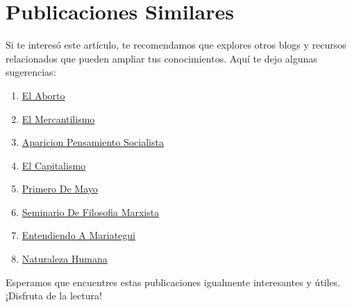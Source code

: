 \documentclass[
  jou,
  floatsintext,
  longtable,
  a4paper,
  nolmodern,
  notxfonts,
  notimes,
  12pt,
  colorlinks=true,linkcolor=blue,citecolor=blue,urlcolor=blue]{apa7}
\providecommand{\tightlist}{%
  \setlength{\itemsep}{0pt}\setlength{\parskip}{0pt}}
\begin{document}
\section{Publicaciones Similares}\label{publicaciones-similares}

Si te interesó este artículo, te recomendamos que explores otros blogs y
recursos relacionados que pueden ampliar tus conocimientos. Aquí te dejo
algunas sugerencias:

\begin{enumerate}
\def\labelenumi{\arabic{enumi}.}
\tightlist
\item
  \href{https://dialectica-y-mercado.netlify.app/posts/2015-05-14-el-aborto/index.pdf}{}
  \href{https://dialectica-y-mercado.netlify.app/posts/2015-05-14-el-aborto}{El
  Aborto}
\item
  \href{https://dialectica-y-mercado.netlify.app/posts/2017-05-23-el-mercantilismo/index.pdf}{}
  \href{https://dialectica-y-mercado.netlify.app/posts/2017-05-23-el-mercantilismo}{El
  Mercantilismo}
\item
  \href{https://dialectica-y-mercado.netlify.app/posts/2018-04-23-aparicion-pensamiento-socialista/index.pdf}{}
  \href{https://dialectica-y-mercado.netlify.app/posts/2018-04-23-aparicion-pensamiento-socialista}{Aparicion
  Pensamiento Socialista}
\item
  \href{https://dialectica-y-mercado.netlify.app/posts/2023-03-03-el-capitalismo/index.pdf}{}
  \href{https://dialectica-y-mercado.netlify.app/posts/2023-03-03-el-capitalismo}{El
  Capitalismo}
\item
  \href{https://dialectica-y-mercado.netlify.app/posts/2023-04-29-primero-de-mayo/index.pdf}{}
  \href{https://dialectica-y-mercado.netlify.app/posts/2023-04-29-primero-de-mayo}{Primero
  De Mayo}
\item
  \href{https://dialectica-y-mercado.netlify.app/posts/2023-05-19-seminario-de-filosofia-marxista/index.pdf}{}
  \href{https://dialectica-y-mercado.netlify.app/posts/2023-05-19-seminario-de-filosofia-marxista}{Seminario
  De Filosofia Marxista}
\item
  \href{https://dialectica-y-mercado.netlify.app/posts/2023-06-09-entendiendo-a-mariategui/index.pdf}{}
  \href{https://dialectica-y-mercado.netlify.app/posts/2023-06-09-entendiendo-a-mariategui}{Entendiendo
  A Mariategui}
\item
  \href{https://dialectica-y-mercado.netlify.app/posts/2023-06-09-naturaleza-humana/index.pdf}{}
  \href{https://dialectica-y-mercado.netlify.app/posts/2023-06-09-naturaleza-humana}{Naturaleza
  Humana}
\end{enumerate}

Esperamos que encuentres estas publicaciones igualmente interesantes y
útiles. ¡Disfruta de la lectura!
\end{document}
